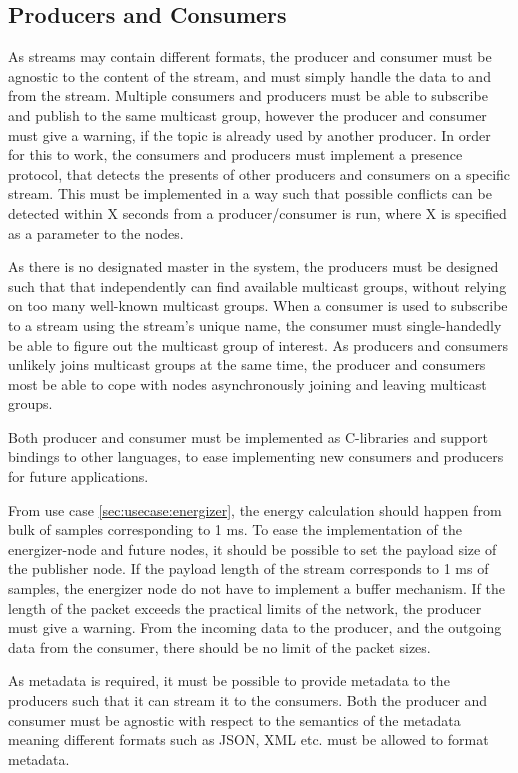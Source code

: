 \subsection{Producers and Consumers}
As streams may contain different formats, the producer and consumer must be agnostic to the content of the stream, and must simply handle the data to and from the stream.
Multiple consumers and producers must be able to subscribe and publish to the same multicast group, however the producer and consumer must give a warning, if the topic is already used by another producer. In order for this to work, the consumers and producers must implement a presence protocol, that detects the presents of other producers and consumers on a specific stream. This must be implemented in a way such that possible conflicts can be detected within X seconds from a producer/consumer is run, where X is specified as a parameter to the nodes.

As there is no designated master in the system, the producers must be designed such that that independently can find available multicast groups, without relying on too many well-known multicast groups. When a consumer is used to subscribe to a stream using the stream's unique name, the consumer must single-handedly be able to figure out the multicast group of interest.
As producers and consumers unlikely joins multicast groups at the same time, the producer and consumers most be able to cope with nodes asynchronously joining and leaving multicast groups.

Both producer and consumer must be implemented as C-libraries and support bindings to other languages, to ease implementing new consumers and producers for future applications.

From use case \ref{sec:usecase:energizer}, the energy calculation should happen from bulk of samples corresponding to 1 ms. To ease the implementation of the energizer-node and future nodes, it should be possible to set the payload size of the publisher node. If the payload length of the stream corresponds to 1 ms of samples, the energizer node do not have to implement a buffer mechanism. If the length of the packet exceeds the practical limits of the network, the producer must give a warning. From the incoming data to the producer, and the outgoing data from the consumer, there should be no limit of the packet sizes.

As metadata is required, it must be possible to provide metadata to the producers such that it can stream it to the consumers. Both the producer and consumer must be agnostic with respect to the semantics of the metadata meaning different formats such as JSON, XML etc. must be allowed to format metadata.

